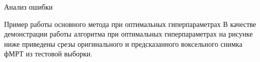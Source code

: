 \documentclass[9pt,pdf]{beamer} %
\begin{document}
\begin{frame}{Анализ ошибки}
\begin{block}{Пример работы основного метода при оптимальных гиперпараметрах}
В качестве демонстрации работы алгоритма при оптимальных гиперпараметрах на рисунке ниже приведены срезы оригинального и предсказанного воксельного снимка фМРТ из тестовой выборки. 
\begin{figure}[h!]
    \centering
    \hfill
    \hfill
    \label{fig:5}
\end{figure}
\end{block}

\end{frame}
\end{document}
